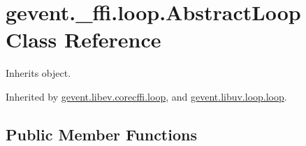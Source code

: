 \hypertarget{classgevent_1_1__ffi_1_1loop_1_1_abstract_loop}{}\section{gevent.\+\_\+ffi.\+loop.\+Abstract\+Loop Class Reference}
\label{classgevent_1_1__ffi_1_1loop_1_1_abstract_loop}


Inherits object.



Inherited by \hyperlink{classgevent_1_1libev_1_1corecffi_1_1loop}{gevent.\+libev.\+corecffi.\+loop}, and \hyperlink{classgevent_1_1libuv_1_1loop_1_1loop}{gevent.\+libuv.\+loop.\+loop}.

\subsection*{Public Member Functions}
